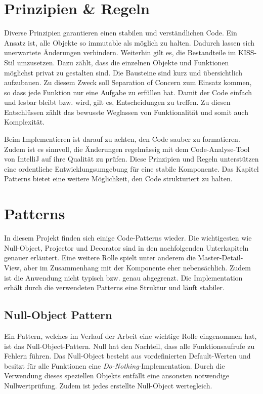 \section{Prinzipien \& Regeln}
\label{sec:principleRules}

Diverse Prinzipien garantieren einen stabilen und verständlichen Code. 
Ein Ansatz ist, alle Objekte so immutable als möglich zu halten. 
Dadurch lassen sich unerwartete Änderungen verhindern. 
Weiterhin gilt es, die Bestandteile im KISS-Stil umzusetzen. 
Dazu zählt, dass die einzelnen Objekte und Funktionen möglichst privat zu gestalten sind. 
Die Bausteine sind kurz und übersichtlich aufzubauen. 
Zu diesem Zweck soll Separation of Concern zum Einsatz kommen, so dass jede Funktion nur eine Aufgabe zu erfüllen hat. 
Damit der Code einfach und lesbar bleibt bzw. wird, gilt es, Entscheidungen zu treffen. 
Zu diesen Entschlüssen zählt das bewusste Weglassen von Funktionalität und somit auch Komplexität. 

Beim Implementieren ist darauf zu achten, den Code sauber zu formatieren. 
Zudem ist es sinnvoll, die Änderungen regelmässig mit dem Code-Analyse-Tool von IntelliJ auf ihre Qualität zu prüfen. 
Diese Prinzipien und Regeln unterstützen eine ordentliche Entwicklungsumgebung für eine stabile Komponente. 
Das Kapitel Patterns bietet eine weitere Möglichkeit, den Code strukturiert zu halten. 


\section{Patterns}
\label{sec:patterns}

In diesem Projekt finden sich einige Code-Patterns wieder. 
Die wichtigesten wie Null-Object, Projector und Decorator sind in den nachfolgenden Unterkapiteln genauer erläutert. 
Eine weitere Rolle spielt unter anderem die Master-Detail-View, aber im Zusammenhang mit der Komponente eher nebensächlich. 
Zudem ist die Anwendung nicht typisch bzw. genau abgegrenzt. 
Die Implementation erhält durch die verwendeten Patterns eine Struktur und läuft stabiler. 


\subsection{Null-Object Pattern}
\label{sec:nullPattern}

Ein Pattern, welches im Verlauf der Arbeit eine wichtige Rolle eingenommen hat, ist das Null-Object-Pattern. 
Null hat den Nachteil, dass alle Funktionsaufrufe zu Fehlern führen. 
Das Null-Object besteht aus vordefinierten Default-Werten und besitzt für alle Funktionen eine \emph{Do-Nothing}-Implementation. 
Durch die Verwendung dieses speziellen Objekts entfällt eine ansonsten notwendige Nullwertprüfung. 
Zudem ist jedes erstellte Null-Object wertegleich. 

